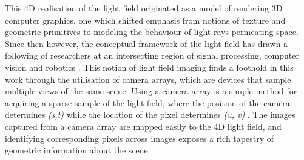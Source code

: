 \documentclass[openany]{book}
\begin{document}
This 4D realisation of the light field originated as a model of rendering 3D computer graphics, one which shifted emphasis from notions of texture and geometric primitives to modeling the behaviour of light rays permeating space. Since then however, the conceptual framework of the light field has drawn a following of researchers at an intersecting region of signal processing, computer vision and robotics \cite{dansereau2014phd}. This notion of light field imaging finds a foothold in this work through the utilisation of camera arrays, which are devices that sample multiple views of the same scene. Using a camera array is a simple method for acquiring a sparse sample of the light field, where the position of the camera determines \textit{(s,t)} while the location of the pixel determines \textit{(u, v)} \cite{yao2016camarray}. The images captured from a camera array are mapped easily to the 4D light field, and identifying corresponding pixels across images exposes a rich tapestry of geometric information about the scene. 
\end{document}
